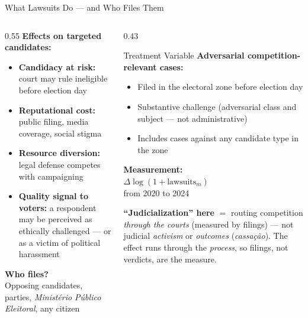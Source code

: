 \documentclass[aspectratio=169,10pt]{beamer}
\begin{document}
\begin{frame}{What Lawsuits Do --- and Who Files Them}
\begin{columns}[T]
\begin{column}{0.55\textwidth}
\textbf{Effects on targeted candidates:}
\begin{itemize}
  \item \textbf{Candidacy at risk:} court may rule ineligible before election day
  \item \textbf{Reputational cost:} public filing, media coverage, social stigma
  \item \textbf{Resource diversion:} legal defense competes with campaigning
  \item \textbf{Quality signal to voters:} a respondent may be perceived as ethically challenged --- or as a victim of political harassment
\end{itemize}
\bigskip
\textbf{Who files?}\\
Opposing candidates, parties, \emph{Ministério Público Eleitoral}, any citizen
\end{column}
\begin{column}{0.43\textwidth}
\begin{alertblock}{Treatment Variable}
  \textbf{Adversarial competition-relevant cases:}
  \begin{itemize}
    \item Filed in the electoral zone before election day
    \item Substantive challenge (adversarial class and subject --- not administrative)
    \item Includes cases against any candidate type in the zone
  \end{itemize}
  \bigskip
  \textbf{Measurement:}\\
  $\Delta\log(1+\text{lawsuits}_{m})$\\from 2020 to 2024
\end{alertblock}
\smallskip
\footnotesize\textbf{``Judicialization'' here} $=$ routing competition \emph{through the courts} (measured by filings) --- not judicial \emph{activism} or \emph{outcomes} (\emph{cassa\c{c}\~{a}o}). The effect runs through the \emph{process}, so filings, not verdicts, are the measure.
\end{column}
\end{columns}
\end{frame}
\end{document}
